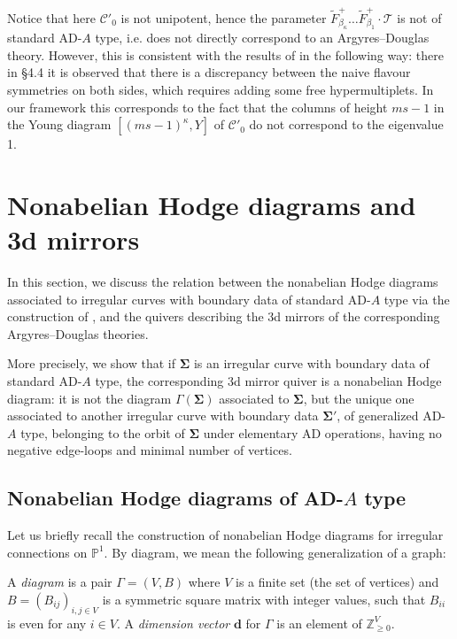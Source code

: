 \documentclass[11pt,a4paper]{amsart}
\numberwithin{equation}{section}
\begin{document}
\begin{remark}
\label{remark:hypermultiplets}
Notice that here $\mathcal C'_0$ is not unipotent, hence the parameter $\widetilde{F}^+_{\beta_\kappa}\dots\widetilde{F}^+_{\beta_1}\cdot \mathcal T$ is not of standard AD-$A$ type, i.e. does not directly correspond to an Argyres--Douglas theory. However, this is consistent with the results of \cite{beem2025simplifying} in the following way: there in §4.4 it is observed that there is a discrepancy between the naive flavour symmetries on both sides, which requires adding some free hypermultiplets. In our framework this corresponds to the fact that the columns of height $ms-1$ in the Young diagram $[(ms-1)^\kappa, Y]$ of $\mathcal C'_0$ do not correspond to the eigenvalue 1.
\end{remark}




\section{Nonabelian Hodge diagrams and 3d mirrors}
\label{sec:diagrams}

In this section, we discuss the relation between the nonabelian Hodge diagrams associated to irregular curves with boundary data of standard AD-$A$ type via the construction of \cite{boalch2020diagrams, doucot2021diagrams}, and the quivers describing the 3d mirrors of the corresponding Argyres--Douglas theories. 

More precisely, we show that if $\bm\Sigma$ is an irregular curve with boundary data of standard AD-$A$ type, the corresponding 3d mirror quiver is a nonabelian Hodge diagram: it is not the diagram $\Gamma(\bm\Sigma)$ associated to $\bm\Sigma$, but the unique one associated to another irregular curve with boundary data $\bm\Sigma'$, of generalized AD-$A$ type, belonging to the orbit of $\bm\Sigma$ under elementary AD operations, having no negative edge-loops and minimal number of vertices. 

\subsection{Nonabelian Hodge diagrams of AD-$A$ type}

Let us briefly recall the construction of nonabelian Hodge diagrams for irregular connections on $\mathbb P^1$. By diagram, we mean the following generalization of a graph:

\begin{definition}
A \textit{diagram} is a pair $\Gamma=(V,B)$ where $V$ is a finite set (the set of vertices) and $B=(B_{ij})_{i,j\in V}$ is a symmetric square matrix with integer values, 
such that $B_{ii}$ is even for any $i\in V$.
A \textit{dimension vector} $\mathbf d$ for $\Gamma$ is an element of $\mathbb Z_{\geq 0}^{V}$. 
\end{definition}
\end{document}
